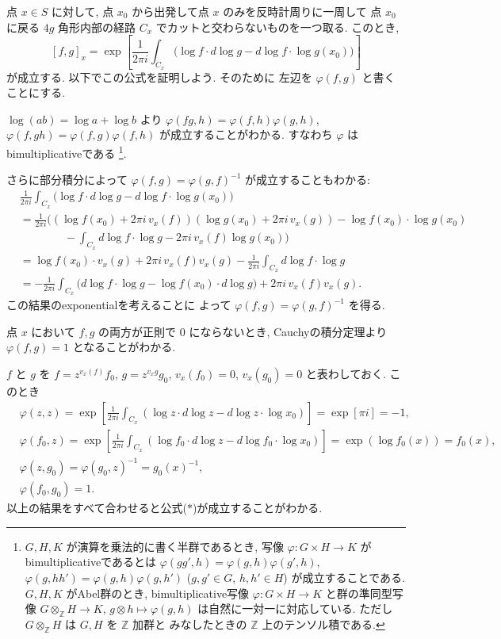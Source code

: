 \documentclass[12pt,twoside]{jarticle}
\newcommand\Z{{\mathbb Z}} %
\theoremstyle{definition} %
\theoremstyle{definition} %
\theoremstyle{definition} %
\numberwithin{theorem}{section}
\numberwithin{equation}{section}
\numberwithin{figure}{section}
\numberwithin{table}{section}
\newcommand\tame[3]{\left[#2,#3\right]_{#1}}
\begin{document}
点 $x\in S$ に対して,
点 $x_0$ から出発して点 $x$ のみを反時計周りに一周して
点 $x_0$ に戻る $4g$ 角形内部の経路 $C_x$ でカットと交わらないものを一つ取る.
このとき,
\[
\tame{x}{f}{g} =
\exp\left[
\frac{1}{2\pi i}\int_{C_x} \bigl(
  \log f\cdot d\log g - d\log f\cdot\log g(x_0)
\bigr)
\right]
\tag{$*$}
\]
が成立する. 以下でこの公式を証明しよう.
そのために 左辺を $\varphi(f,g)$ と書くことにする.

$\log(ab)=\log a+\log b$ より
$\varphi(fg,h)=\varphi(f,h)\varphi(g,h)$,
$\varphi(f,gh)=\varphi(f,g)\varphi(f,h)$ が成立することがわかる.
すなわち $\varphi$ はbimultiplicativeである%
\footnote{$G,H,K$ が演算を乗法的に書く半群であるとき,
写像 $\varphi:G\times H\to K$ がbimultiplicativeであるとは
$\varphi(gg',h)=\varphi(g,h)\varphi(g',h)$,
$\varphi(g,hh')=\varphi(g,h)\varphi(g,h')$
($g,g'\in G$, $h,h'\in H$)
が成立することである.
$G,H,K$ がAbel群のとき, bimultiplicative写像 $\varphi:G\times H\to K$
と群の準同型写像 $G\otimes_\Z H\to K$, $g\otimes h\mapsto\varphi(g,h)$
は自然に一対一に対応している. ただし $G\otimes_\Z H$ は $G,H$ を $\Z$ 加群と
みなしたときの $\Z$ 上のテンソル積である.
}.

さらに部分積分によって $\varphi(f,g)=\varphi(g,f)^{-1}$ が成立することもわかる:
\begin{align*}
&
\frac{1}{2\pi i}\int_{C_x} \bigl(
  \log f\cdot d\log g - d\log f\cdot\log g(x_0)
\bigr)
\\ &
=\frac{1}{2\pi i}\bigl(
   (\log f(x_0)+2\pi i\,v_x(f))(\log g(x_0)+2\pi i\,v_x(g))
  - \log f(x_0)\cdot\log g(x_0)
\\ & \qquad\qquad
  - \int_{C_x} d\log f\cdot\log g
  - 2\pi i\,v_x(f)\log g(x_0)
\bigr)
\\ &
= \log f(x_0)\cdot v_x(g) + 2\pi i\,v_x(f)v_x(g)
- \frac{1}{2\pi i}\int_{C_x}d\log f\cdot\log g
\\ &
=
-
\frac{1}{2\pi i}\int_{C_x} \bigl(
  d\log f\cdot \log g - \log f(x_0)\cdot d\log g
\bigr)
+ 2\pi i\,v_x(f)v_x(g).
\end{align*}
この結果のexponentialを考えることに
よって $\varphi(f,g)=\varphi(g,f)^{-1}$ を得る.

点 $x$ において $f,g$ の両方が正則で $0$ にならないとき,
Cauchyの積分定理より $\varphi(f,g)=1$ となることがわかる.

$f$ と $g$ を $f=z^{v_x(f)}f_0$, $g=z^{v_x{g}}g_0$,
$v_x(f_0)=0$, $v_x(g_0)=0$ と表わしておく.
このとき
\begin{align*}
&
\varphi(z,z)
=\exp\left[
  \frac{1}{2\pi i}\int_{C_x}(\log z\cdot d\log z-d\log z\cdot\log x_0)
\right]
=\exp[\pi i]= -1,
\\ &
\varphi(f_0,z)
=\exp\left[
  \frac{1}{2\pi i}\int_{C_x}(\log f_0\cdot d\log z-d\log f_0\cdot\log x_0)
\right]
= \exp(\log f_0(x))=f_0(x),
\\ &
\varphi(z,g_0)=\varphi(g_0,z)^{-1}=g_0(x)^{-1},
\\ &
\varphi(f_0,g_0)=1.
\end{align*}
以上の結果をすべて合わせると公式($*$)が成立することがわかる.
\end{document}
